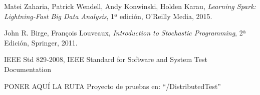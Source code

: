 

\begin{thebibliography}{99}
% 
% 
% 

 Matei Zaharia, Patrick Wendell, Andy Konwinski, Holden Karau, {\it Learning Spark: Lightning-Fast Big Data Analysis}, 1ª edición, O'Reilly Media, 2015.

 John R. Birge, François Louveaux, {\it Introduction to Stochastic Programming}, 2ª Edición, Springer, 2011.

 IEEE Std 829-2008, IEEE Standard for Software and System Test Documentation


 PONER AQUÍ LA RUTA
 Proyecto de pruebas en: ``/DistributedTest''

\end{thebibliography}

